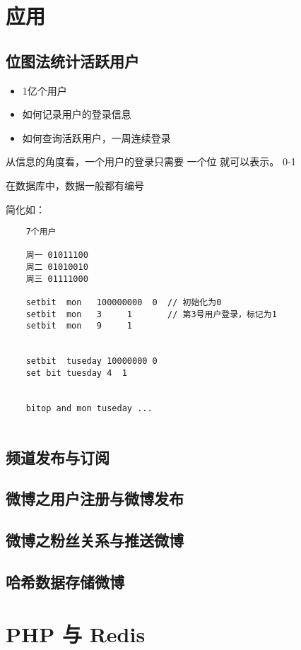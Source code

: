 \documentclass[UTF8,a4paper,12pt]{ctexbook}
\begin{document}
\chapter{应用}	
	\section{位图法统计活跃用户}
		\begin{itemize}
			\item 1亿个用户
			\item 如何记录用户的登录信息
			\item 如何查询活跃用户，一周连续登录
		\end{itemize}
	
		从信息的角度看，一个用户的登录只需要 一个位 就可以表示。 0-1
		
		在数据库中，数据一般都有编号
		
		简化如：
			\begin{lstlisting}
	7个用户
	
	周一 01011100
	周二 01010010
	周三 01111000
	
	setbit  mon   100000000  0  // 初始化为0
	setbit  mon   3     1       // 第3号用户登录，标记为1
	setbit  mon   9     1
	
	
	setbit  tuseday 10000000 0
	set bit tuesday 4  1
	

	bitop and mon tuseday ...
	
			\end{lstlisting}
	\section{频道发布与订阅}
	
	\section{微博之用户注册与微博发布}
	
	\section{微博之粉丝关系与推送微博}
	
	\section{哈希数据存储微博}



\chapter{PHP 与 Redis}
\end{document}
